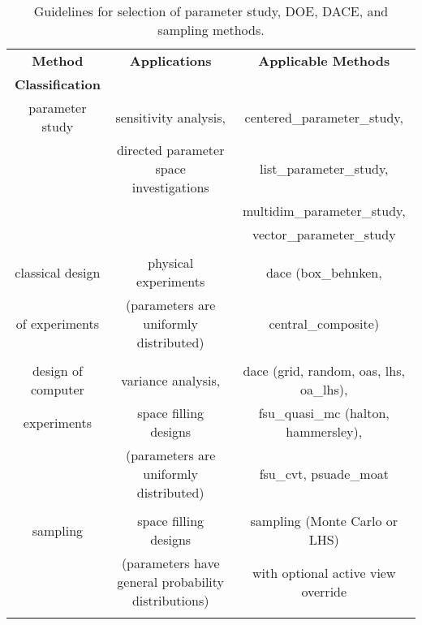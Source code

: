 \begin{table}[hbp]
\centering
\caption{Guidelines for selection of parameter study, DOE, DACE, and
sampling methods.}
\label{dace:usage:table}\vspace{2mm}
\begin{tabular}{|c|c|c|}
\hline
\textbf{Method} & \textbf{Applications} & \textbf{Applicable Methods} \\
\textbf{Classification} & & \\
\hline
parameter study & sensitivity analysis,                       & centered\_parameter\_study, \\
                & directed parameter space investigations     & list\_parameter\_study, \\
                &                                             & multidim\_parameter\_study, \\
                &                                             & vector\_parameter\_study \\
                   &                                             & \\
\hline
classical design & physical experiments                       & dace (box\_behnken, \\
of experiments   & (parameters are uniformly distributed)     & central\_composite) \\
                   &                                             & \\
\hline
design of computer & variance analysis,                       & dace (grid, random,
                                                                oas, lhs, oa\_lhs), \\
experiments        & space filling designs                    & fsu\_quasi\_mc (halton, 
                                                                hammersley), \\
                   & (parameters are uniformly distributed)   & fsu\_cvt, psuade\_moat \\
                   &                                             & \\
\hline
sampling           & space filling designs                    & sampling (Monte Carlo or LHS) \\
                   & (parameters have general probability distributions) & with optional active view override \\
                   &                                             & \\
\hline
\end{tabular}
\end{table}
